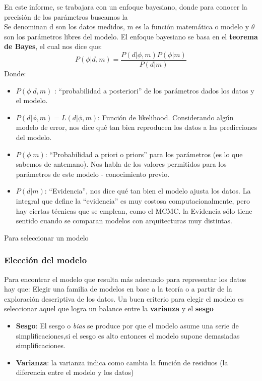 \documentclass[twocolumn]{article}
\begin{document}
En este informe, se trabajara con un enfoque bayesiano, donde para conocer la precisión de los parámetros buscamos la 
\\
Se denominan d son los datos medidos, m es la función matemática o modelo y $\theta$ son los parámetros libres del modelo. 
El enfoque bayesiano se basa en el \textbf{teorema de Bayes}, el cual nos dice que: 
\begin{equation}
P(\phi|d,m)=\frac{P(d|\phi,m)P(\phi|m)}{P(d|m)}
\end{equation}
Donde: 
\begin{itemize}
\item $P(\phi|d,m )$ : ``probabilidad a posteriori'' de los parámetros dados los datos y el modelo.
\item $P(d|\phi,m)=L(d|\phi,m)$: Función de likelihood. Considerando algún modelo de error, nos dice qué tan bien reproducen los datos a las predicciones del modelo.
\item $P(\phi|m)$: ``Probabilidad a priori o priors'' para los parámetros (es lo que sabemos de antemano). Nos habla de los valores permitidos para los parámetros de este modelo - conocimiento previo.
\item $P(d|m)$: ``Evidencia'', nos dice qué tan bien el modelo ajusta los datos. La integral que define la ``evidencia'' es muy costosa computacionalmente, pero hay ciertas técnicas que se emplean,
como el MCMC. la Evidencia sólo tiene sentido cuando se comparan modelos con arquitecturas muy distintas.
\end{itemize}

Para seleccionar un modelo 


\subsubsection{Elección del modelo}
Para encontrar el modelo que resulta más adecuado para representar los datos hay que: Elegir una familia de modelos en base a la teoría o a partir de la exploración descriptiva de los datos.
Un buen criterio para elegir el modelo es seleccionar aquel que logra un balance entre la \textbf{varianza} y el \textbf{sesgo}
\begin{itemize}
\item \textbf{Sesgo}: El sesgo o \textit{bias} se produce por que el modelo asume una serie de simplificaciones,si el sesgo es alto entonces el modelo supone demasiadas simplificaciones.
\item \textbf{Varianza}: la varianza indica como cambia la función de residuos (la diferencia entre el modelo y los datos)
\end{itemize}
\end{document}
